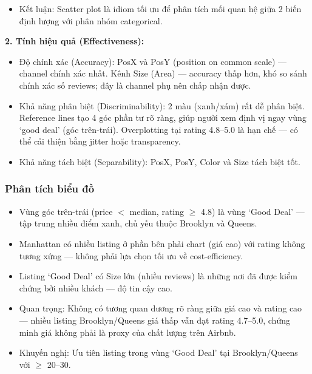 \begin{itemize}
\begin{itemize}
        \item Ưu tiên 3 -- Kích thước điểm (Size / Area): Size mã hóa Number of Reviews (Quantitative) --- listing có nhiều review tương ứng với điểm lớn hơn. Theo Mackinlay, Area không phải kênh mạnh nhất cho dữ liệu định lượng về độ chính xác, nhưng đây là kênh phụ với mục tiêu encode độ tin cậy (trust level) thay vì giá trị chính xác: người xem không cần biết số review cụ thể, chỉ cần nhận biết listing nào ``đã được nhiều người kiểm chứng'' để củng cố độ tin tưởng vào Good Deal được phát hiện.
    \end{itemize}
    \item Kết luận: Scatter plot là idiom tối ưu để phân tích mối quan hệ giữa 2 biến định lượng với phân nhóm categorical.
\end{itemize}

\textbf{2. Tính hiệu quả (Effectiveness):}

\begin{itemize}
    \item Độ chính xác (Accuracy): PosX và PosY (position on common scale) --- channel chính xác nhất. Kênh Size (Area) --- accuracy thấp hơn, khó so sánh chính xác số reviews; đây là channel phụ nên chấp nhận được.
    \item Khả năng phân biệt (Discriminability): 2 màu (xanh/xám) rất dễ phân biệt. Reference lines tạo 4 góc phần tư rõ ràng, giúp người xem định vị ngay vùng `good deal' (góc trên-trái). Overplotting tại rating 4.8--5.0 là hạn chế --- có thể cải thiện bằng jitter hoặc transparency.
    \item Khả năng tách biệt (Separability): PosX, PosY, Color và Size tách biệt tốt.
\end{itemize}

\subsubsection{Phân tích biểu đồ}

\begin{itemize}
    \item Vùng góc trên-trái (price $<$ median, rating $\geq$ 4.8) là vùng `Good Deal' --- tập trung nhiều điểm xanh, chủ yếu thuộc Brooklyn và Queens.
    \item Manhattan có nhiều listing ở phần bên phải chart (giá cao) với rating không tương xứng --- không phải lựa chọn tối ưu về cost-efficiency.
    \item Listing `Good Deal' có Size lớn (nhiều reviews) là những nơi đã được kiểm chứng bởi nhiều khách --- độ tin cậy cao.
    \item Quan trọng: Không có tương quan dương rõ ràng giữa giá cao và rating cao --- nhiều listing Brooklyn/Queens giá thấp vẫn đạt rating 4.7--5.0, chứng minh giá không phải là proxy của chất lượng trên Airbnb.
    \item Khuyến nghị: Ưu tiên listing trong vùng `Good Deal' tại Brooklyn/Queens với  $\geq$ 20--30.
\end{itemize}
